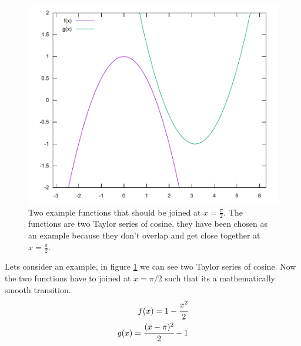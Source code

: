 \documentclass[11pt,DIV=10,final]{scrreprt} %
\begin{document}
\begin{figure}[h]
  \centering
  \includegraphics[width=.9\textwidth]{plots/cos_taylor.pdf}
  \caption{Two example functions that should be joined at $x=\frac{\pi}{2}$. The functions are two Taylor series of cosine, they have been chosen as an example because they don't overlap and get
  close together at $x = \frac{\pi}{2}.$}\label{fig:cos_taylor}
\end{figure}

Lets consider an example, in figure \ref{fig:cos_taylor} we can see two Taylor series of cosine. Now the two functions have to joined at $x = \pi / 2$ such that its a mathematically smooth transition.
\begin{align}
  \label{joint:f}
  f(x) = 1 - \cfrac{x^{2}}{2} \\
  \label{joint:g}
  g(x) = \cfrac{(x - \pi)^{2}}{2} -  1
\end{align}
\end{document}
